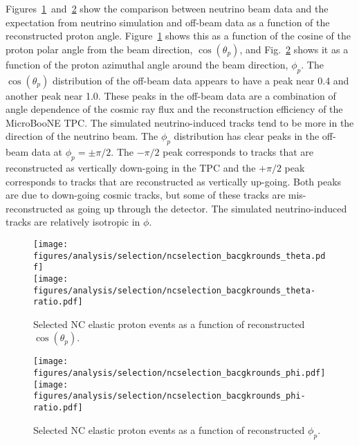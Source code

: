     Figures~\ref{fig:ncetheta}~and~\ref{fig:ncephi} show the comparison between
    neutrino beam data and the expectation from neutrino simulation and
    off-beam data as a function of the reconstructed proton angle.
    Figure~\ref{fig:ncetheta} shows this as a function of the cosine of the
    proton polar angle from the beam direction, $\cos(\theta_p)$, and
    Fig.~\ref{fig:ncephi} shows it as a function of the proton azimuthal angle
    around the beam direction, $\phi_p$. The $\cos(\theta_p)$ distribution of
    the off-beam data appears to have a peak near 0.4 and another peak near
    1.0. These peaks in the off-beam data are a combination of angle dependence
    of the cosmic ray flux and the reconstruction efficiency of the MicroBooNE
    TPC. The simulated neutrino-induced tracks tend to be more in the direction
    of the neutrino beam. The $\phi_p$ distribution has clear peaks in the
    off-beam data at $\phi_p = \pm \pi/2$. The $-\pi/2$ peak corresponds to
    tracks that are reconstructed as vertically down-going in the TPC and the
    $+\pi/2$ peak corresponds to tracks that are reconstructed as vertically
    up-going. Both peaks are due to down-going cosmic tracks, but some of these
    tracks are mis-reconstructed as going up through the detector. The
    simulated neutrino-induced tracks are relatively isotropic in $\phi$.
    \begin{figure}[ht]
      \centering
      \texttt{[image: figures/analysis/selection/ncselection\_bacgkrounds\_theta.pdf]} \\
      \texttt{[image: figures/analysis/selection/ncselection\_bacgkrounds\_theta-ratio.pdf]} \\
      \caption{Selected NC elastic proton events as a function of reconstructed $\cos(\theta_p)$.}
      \label{fig:ncetheta}
    \end{figure}
    \begin{figure}[ht]
      \centering
      \texttt{[image: figures/analysis/selection/ncselection\_bacgkrounds\_phi.pdf]} \\
      \texttt{[image: figures/analysis/selection/ncselection\_bacgkrounds\_phi-ratio.pdf]} \\
      \caption{Selected NC elastic proton events as a function of reconstructed $\phi_p$.}
      \label{fig:ncephi}
    \end{figure}

